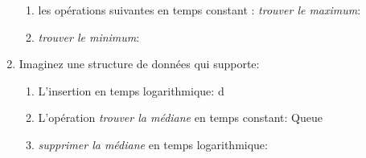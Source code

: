 \documentclass[11pt]{article}
\begin{document}
\begin{enumerate}
\begin{enumerate}
\item les opérations suivantes en temps constant : \textit{trouver le maximum}:
{\color{dkgreen}   }

\item \textit{trouver le minimum}:
{\color{dkgreen}   }
\end{enumerate} 

\item Imaginez une structure de données qui supporte:
\begin{enumerate}
\item L'insertion en temps logarithmique:
{\color{dkgreen}  d }

\item L'opération \textit{trouver la médiane} en temps constant:
{\color{dkgreen} Queue   }

\item \textit{supprimer la médiane} en temps logarithmique:
{\color{dkgreen}   }
\end{enumerate}
\end{enumerate}
\end{document}
